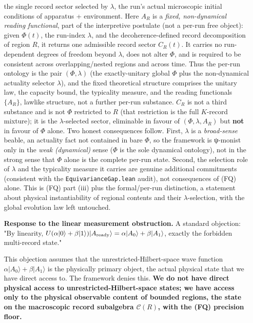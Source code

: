 \documentclass[11pt,a4paper]{article}
\begin{document}
the single record sector selected by $\lambda$, the run's actual microscopic initial conditions of apparatus + environment. Here $A_R$ is a \emph{fixed, non-dynamical reading functional}, part of the interpretive postulate (not a per-run free object): given $\Phi(t)$, the run-index $\lambda$, and the decoherence-defined record decomposition of region $R$, it returns one admissible record sector $C_R(t)$. It carries no run-dependent degrees of freedom beyond $\lambda$, does not alter $\Phi$, and is required to be consistent across overlapping/nested regions and across time. Thus the per-run ontology is the pair $(\Phi, \lambda)$ (the exactly-unitary global $\Phi$ plus the non-dynamical actuality selector $\lambda$), and the fixed theoretical structure comprises the unitary law, the capacity bound, the typicality measure, and the reading functionals $\{A_R\}$, lawlike structure, not a further per-run substance. $C_R$ is not a third substance and is not $\Phi$ restricted to $R$ (that restriction is the full $K$-record mixture); it is the $\lambda$-selected sector, eliminable in favour of $(\Phi, \lambda, A_R)$ but \textbf{not} in favour of $\Phi$ alone. Two honest consequences follow. First, $\lambda$ is a \emph{broad-sense} beable, an actuality fact not contained in bare $\Phi$, so the framework is ψ-monist only in the \emph{weak (dynamical)} sense ($\Phi$ is the sole dynamical ontology), not in the strong sense that $\Phi$ alone is the complete per-run state. Second, the selection role of $\lambda$ and the typicality measure it carries are genuine additional commitments (consistent with the \texttt{EquivarianceGap.lean} audit), not consequences of (FQ) alone. This is (FQ) part (iii) plus the formal/per-run distinction, a statement about physical instantiability of regional contents and their $\lambda$-selection, with the global evolution law left untouched.

\textbf{Response to the linear measurement obstruction.} A standard objection: "By linearity, $U(\alpha|0\rangle + \beta|1\rangle)|A_{\rm ready}\rangle = \alpha|A_0\rangle + \beta|A_1\rangle$, exactly the forbidden multi-record state."

This objection assumes that the unrestricted-Hilbert-space wave function $\alpha|A_0\rangle + \beta|A_1\rangle$ is the physically primary object, the actual physical state that we have direct access to. The framework denies this. \textbf{We do not have direct physical access to unrestricted-Hilbert-space states; we have access only to the physical observable content of bounded regions, the state on the macroscopic record subalgebra $\mathcal{C}(R)$, with the (FQ) precision floor.}
\end{document}
